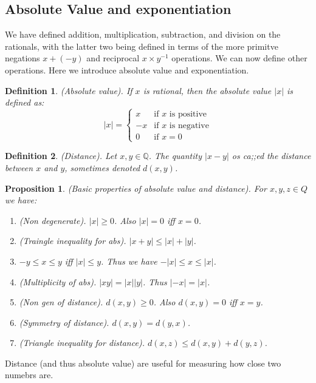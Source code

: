 \documentclass{article}
\newtheorem{definition}{Definition}[subsection]
\newtheorem{proposition}{Proposition}[subsection]
\newcommand{\Q}{\mathbb{Q}}
\begin{document}
\subsection{Absolute Value and exponentiation} 

We have defined addition, multiplication, subtraction, and division
on the rationals, with the latter two being defined in terms of the
more primitve negations $x + (-y)$  and reciprocal $x \times y^{-1}$ 
operations. We can now define other operations. Here we introduce 
absolute value and exponentiation.

\begin{definition}
	(Absolute value). If $x$ is rational, then the absolute value 
	$|x|$ is defined as:
	$$
	|x| = \begin{cases}
		x & \text{if $x$ is positive}  \\	
		-x & \text{if $x$ is negative} \\ 
		0 & \text{if $x = 0$}
	\end{cases}
	$$
\end{definition}

\begin{definition}
	(Distance). Let $x,y\in\Q$. The quantity $|x-y|$ os ca;;ed 
	the distance between $x$ and $y$, sometimes denoted $d(x,y)$.
\end{definition}

\begin{proposition}
	(Basic properties of absolute value and distance). For 
	$x,y,z \in Q$ we have: 
	\begin{enumerate}[label=(\alph*)]
		\item (Non degenerate). $|x| \geq 0$. Also $|x| = 0$ iff 
			$x =0$. 
		\item (Traingle inequality for abs). $|x + y| \leq |x| + |y|$.
		\item $-y \leq x \leq y$ iff $|x| \leq y$. Thus we have 
			$-|x| \leq x \leq |x|$. 
		\item (Multiplicity of abs). $|xy| = |x||y|$. Thus $|-x|=|x|$.
		\item (Non gen of distance). $d(x,y) \geq 0$. Also $d(x,y) = 0$ 
			iff $x = y$.
		\item (Symmetry of distance). $d(x,y) = d(y,x)$.
		\item (Triangle inequality for distance).
			$d(x,z) \leq d(x,y) + d(y,z)$.
	\end{enumerate}
\end{proposition}

Distance (and thus absolute value) are useful for measuring
how close two numebrs are. 
\end{document}
